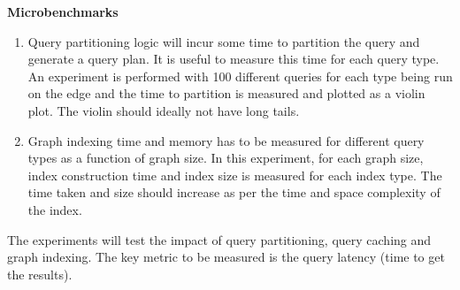 \documentclass[conference]{IEEEtran}
\begin{document}
\textbf{Microbenchmarks}
\begin{enumerate}%
	\item Query partitioning logic will incur some time to partition the query and generate a query plan. It is useful to measure this time for each query type. An experiment is performed with 100 different queries for each type being run on the edge and the time to partition is measured and plotted as a violin plot. The violin should ideally not have long tails.
	\item Graph indexing time and memory has to be measured for different query types as a function of graph size. In this experiment, for each graph size, index construction time and index size is measured for each index type. The time taken and size should increase as per the time and space complexity of the index.
\end{enumerate}

The experiments will test the impact of query partitioning, query caching and graph indexing. The key metric to be measured is the query latency (time to get the results).  
\end{document}

